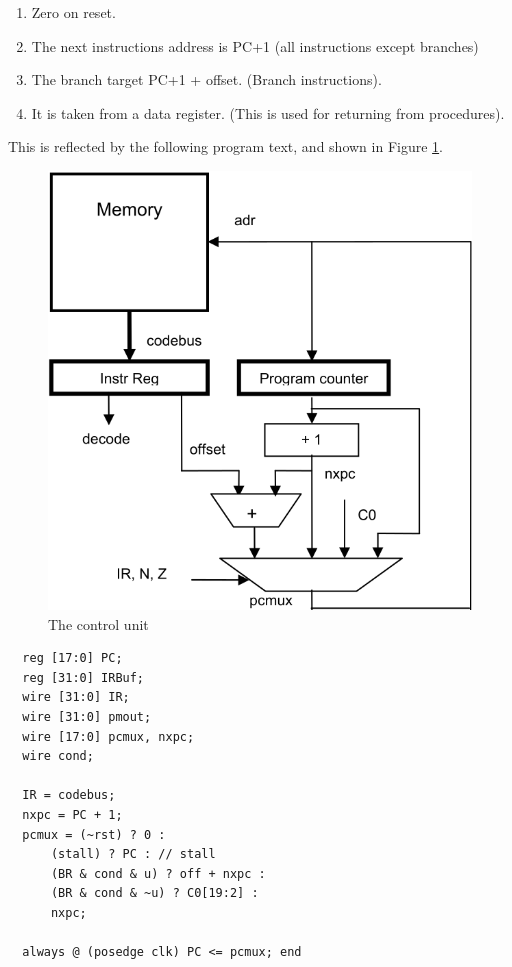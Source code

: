 \begin{enumerate}
  \item Zero on reset.
  \item The next instructions address is PC+1 (all instructions except branches)
  \item The branch target PC+1 + offset. (Branch instructions).
  \item It is taken from a data register. (This is used for returning from procedures).
\end{enumerate}

This is reflected by the following program text, and shown in Figure \ref{fig:cu}.

\begin{figure}[h!]
	\centering
	\includegraphics[width=.9\textwidth]{i/F/8.png}
	\caption{The control unit}
	\label{fig:cu}
\end{figure}

\begin{verbatim}
  reg [17:0] PC;
  reg [31:0] IRBuf;
  wire [31:0] IR;
  wire [31:0] pmout;
  wire [17:0] pcmux, nxpc;
  wire cond;
 
  IR = codebus;
  nxpc = PC + 1;
  pcmux = (~rst) ? 0 :
      (stall) ? PC : // stall
      (BR & cond & u) ? off + nxpc :
      (BR & cond & ~u) ? C0[19:2] :
      nxpc;
 
  always @ (posedge clk) PC <= pcmux; end
\end{verbatim}

